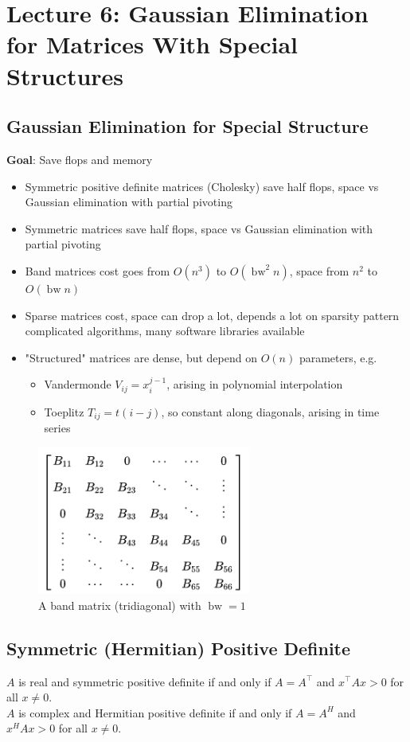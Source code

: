\documentclass[11pt]{article}
\numberwithin{equation}{section}
\begin{document}
\newpage
\section{Lecture 6: Gaussian Elimination for Matrices With Special Structures}
\subsection{Gaussian Elimination for Special Structure}
\textbf{Goal}: Save flops and memory
\begin{itemize}
    \item Symmetric positive definite matrices (Cholesky) save half flops, space vs Gaussian elimination with partial pivoting
    \item Symmetric matrices save half flops, space vs Gaussian elimination with partial pivoting
    \item Band matrices cost goes from $O(n^3)$ to $O(\operatorname{bw}^2 n)$, space from $n^2$ to $O(\operatorname{bw} n)$
    \item Sparse matrices cost, space can drop a lot, depends a lot on sparsity pattern complicated algorithms, many software libraries available
    \item "Structured" matrices are dense, but depend on $O(n)$ parameters, e.g. \begin{itemize}
        \item Vandermonde $V_{ij} = x_i^{j-1}$, arising in polynomial interpolation
        \item Toeplitz $T_{ij} = t(i-j)$, so constant along diagonals, arising in time series
    \end{itemize} 
\end{itemize}

\begin{figure}[h]
    \centering
    \includegraphics[width = 7cm]{images/lec6-1.png}
    \caption{A band matrix (tridiagonal) with $\operatorname{bw}=1$}
\end{figure}

\subsection{Symmetric (Hermitian) Positive Definite}
\begin{definition}
    $A$ is real and symmetric positive definite if and only if $A=A^\top$ and $x^\top Ax > 0$ for all $x \neq 0$.\\
    $A$ is complex and Hermitian positive definite if and only if $A=A^H$ and $x^H Ax > 0$ for all $x \neq 0$.
\end{definition}
\end{document}
